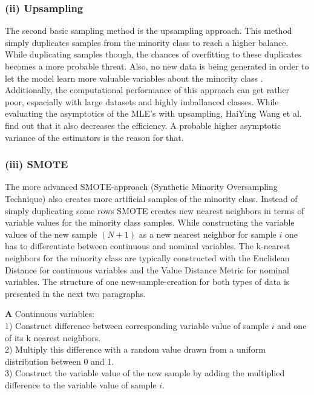 \documentclass[12pt,titlepage]{article}
\begin{document}
\subsubsection*{(ii) Upsampling}

The second basic sampling method is the upsampling approach. This method simply duplicates samples from the minority class to reach a higher balance. While duplicating samples though, the chances of overfitting to these duplicates becomes a more probable threat. Also, no new data is being generated in order to let the model learn more valuable variables about the minority class \cite{mining_rarity}. Additionally, the computational performance of this approach can get rather poor, espacially with large datasets and highly imballanced classes. While evaluating the asymptotics of the MLE's with upsampling, HaiYing Wang et al. find out that it also decreases the efficiency. A probable higher asymptotic variance of the estimators is the reason for that. \\

\subsubsection*{(iii) SMOTE}

The more advanced SMOTE-approach (Synthetic Minority Oversampling Technique) \cite{smote} also creates more artificial samples of the minority class. Instead of simply duplicating some rows SMOTE creates new nearest neighbors in terms of variable values for the minority class samples. While constructing the variable values of the new sample $(N + 1)$ as a new nearest neighbor for sample $i$ one has to differentiate between continuous and nominal variables. The k-nearest neighbors for the minority class are typically constructed with the Euclidean Distance for continuous variables and the Value Distance Metric for nominal variables. The structure of one new-sample-creation for both types of data is presented in the next two paragraphs.
\vspace{6mm}
\indent

\textbf{A} Continuous variables: \\
1) Construct difference between corresponding variable value of sample $i$ and one of its k nearest neighbors. \\
2) Multiply this difference with a random value drawn from a uniform distribution between 0 and 1. \\
3) Construct the variable value of the new sample by adding the multiplied difference to the variable value of sample $i$.
\vspace{6mm}
\indent
\end{document}
